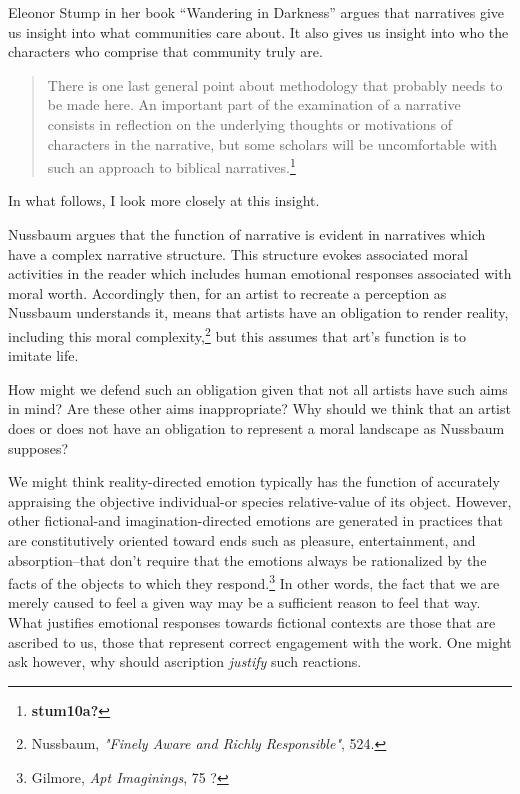 \documentclass[phdthesis,12pt,final]{wuthesis}
\theoremstyle{definition}
\theoremstyle{definition}
\theoremstyle{definition}
\theoremstyle{definition}
\theoremstyle{remark}
\begin{document}
Eleonor Stump in her book ``Wandering in Darkness'' argues that narratives give us insight into what communities care about. It also gives us insight into who the characters who comprise that community truly are.

\begin{quote}
There is one last general point about methodology that probably needs to be made here. An important part of the examination of a narrative consists in reflection on the underlying thoughts or motivations of characters in the narrative, but some scholars will be uncomfortable with such an approach to biblical narratives.\footnote{\textbf{stum10a?}}
\end{quote}

\noindent In what follows, I look more closely at this insight.

Nussbaum argues that the function of narrative is evident in narratives which have a complex narrative structure. This structure evokes associated moral activities in the reader which includes human emotional responses associated with moral worth. Accordingly then, for an artist to recreate a perception as Nussbaum understands it, means that artists have an obligation to render reality, including this moral complexity,\footnote{Nussbaum, \emph{"{Finely Aware} and {Richly Responsible}"}, 524.} but this assumes that art's function is to imitate life.

How might we defend such an obligation given that not all artists have such aims in mind? Are these other aims inappropriate? Why should we think that an artist does or does not have an obligation to represent a moral landscape as Nussbaum supposes?

We might think reality-directed emotion typically has the function of accurately appraising the objective individual-or species relative-value of its object. However, other fictional-and imagination-directed emotions are generated in practices that are constitutively oriented toward ends such as pleasure, entertainment, and absorption--that don't require that the emotions always be rationalized by the facts of the objects to which they respond.\footnote{Gilmore, \emph{Apt {Imaginings}}, 75 ?} In other words, the fact that we are merely caused to feel a given way may be a sufficient reason to feel that way. What justifies emotional responses towards fictional contexts are those that are ascribed to us, those that represent correct engagement with the work. One might ask however, why should ascription \emph{justify} such reactions.
\end{document}
